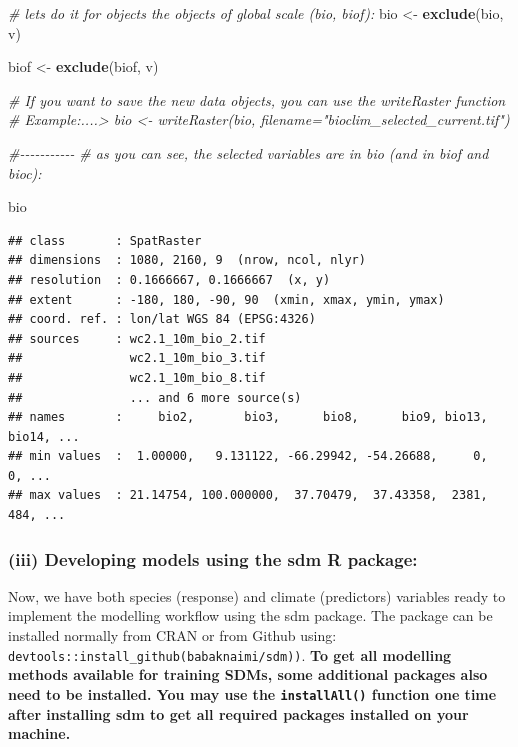 \documentclass[
]{article}
\newenvironment{Shaded}{\begin{snugshade}}{\end{snugshade}}
\newcommand{\CommentTok}[1]{\textcolor[rgb]{0.56,0.35,0.01}{\textit{#1}}}
\newcommand{\FunctionTok}[1]{\textcolor[rgb]{0.13,0.29,0.53}{\textbf{#1}}}
\newcommand{\NormalTok}[1]{#1}
\newcommand{\OtherTok}[1]{\textcolor[rgb]{0.56,0.35,0.01}{#1}}
\begin{document}
\begin{Shaded}
\begin{Highlighting}[]
\CommentTok{\# let\textquotesingle{}s do it for objects the objects of global scale (bio, biof):}
\NormalTok{bio }\OtherTok{\textless{}{-}} \FunctionTok{exclude}\NormalTok{(bio, v)}

\NormalTok{biof }\OtherTok{\textless{}{-}} \FunctionTok{exclude}\NormalTok{(biof, v)}

\CommentTok{\# If you want to save the new data objects, you can use the writeRaster function}
\CommentTok{\# Example:....\textgreater{} bio \textless{}{-} writeRaster(bio, filename="bioclim\_selected\_current.tif")}

\CommentTok{\#{-}{-}{-}{-}{-}{-}{-}{-}{-}{-}{-}}
\CommentTok{\# as you can see, the selected variables are in bio (and in biof and bioc):}

\NormalTok{bio}
\end{Highlighting}
\end{Shaded}

\begin{verbatim}
## class       : SpatRaster 
## dimensions  : 1080, 2160, 9  (nrow, ncol, nlyr)
## resolution  : 0.1666667, 0.1666667  (x, y)
## extent      : -180, 180, -90, 90  (xmin, xmax, ymin, ymax)
## coord. ref. : lon/lat WGS 84 (EPSG:4326) 
## sources     : wc2.1_10m_bio_2.tif  
##               wc2.1_10m_bio_3.tif  
##               wc2.1_10m_bio_8.tif  
##               ... and 6 more source(s)
## names       :     bio2,       bio3,      bio8,      bio9, bio13, bio14, ... 
## min values  :  1.00000,   9.131122, -66.29942, -54.26688,     0,     0, ... 
## max values  : 21.14754, 100.000000,  37.70479,  37.43358,  2381,   484, ...
\end{verbatim}

\subsubsection{(iii) Developing models using the sdm R
package:}\label{iii-developing-models-using-the-sdm-r-package}

Now, we have both species (response) and climate (predictors) variables
ready to implement the modelling workflow using the sdm package. The
package can be installed normally from CRAN or from Github using:
\texttt{devtools::install\_github(\textquotesingle{}babaknaimi/sdm\textquotesingle{}))}.
\textbf{To get all modelling methods available for training SDMs, some
additional packages also need to be installed. You may use the
\texttt{installAll()} function one time after installing sdm to get all
required packages installed on your machine.}
\end{document}
